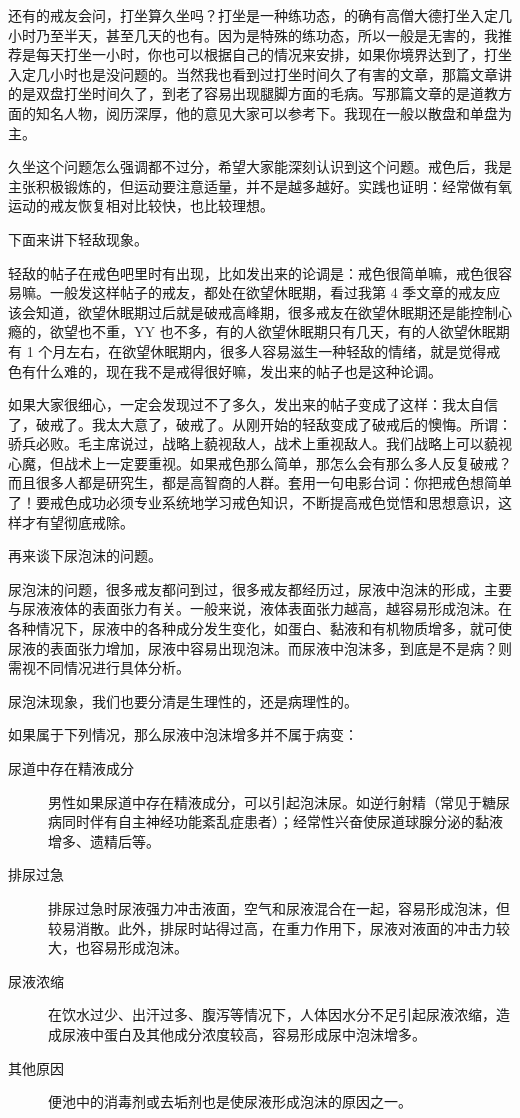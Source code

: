 \documentclass[fontset=founder]{ctexart}
\begin{document}
还有的戒友会问，打坐算久坐吗？打坐是一种练功态，的确有高僧大德打坐入定几小时乃至半天，甚至几天的也有。因为是特殊的练功态，所以一般是无害的，我推荐是每天打坐一小时，你也可以根据自己的情况来安排，如果你境界达到了，打坐入定几小时也是没问题的。当然我也看到过打坐时间久了有害的文章，那篇文章讲的是双盘打坐时间久了，到老了容易出现腿脚方面的毛病。写那篇文章的是道教方面的知名人物，阅历深厚，他的意见大家可以参考下。我现在一般以散盘和单盘为主。

久坐这个问题怎么强调都不过分，希望大家能深刻认识到这个问题。戒色后，我是主张积极锻炼的，但运动要注意适量，并不是越多越好。实践也证明：经常做有氧运动的戒友恢复相对比较快，也比较理想。

下面来讲下轻敌现象。

轻敌的帖子在戒色吧里时有出现，比如发出来的论调是：戒色很简单嘛，戒色很容易嘛。一般发这样帖子的戒友，都处在欲望休眠期，看过我第 4 季文章的戒友应该会知道，欲望休眠期过后就是破戒高峰期，很多戒友在欲望休眠期还是能控制心瘾的，欲望也不重，YY 也不多，有的人欲望休眠期只有几天，有的人欲望休眠期有 1 个月左右，在欲望休眠期内，很多人容易滋生一种轻敌的情绪，就是觉得戒色有什么难的，现在我不是戒得很好嘛，发出来的帖子也是这种论调。

如果大家很细心，一定会发现过不了多久，发出来的帖子变成了这样：我太自信了，破戒了。我太大意了，破戒了。从刚开始的轻敌变成了破戒后的懊悔。所谓：骄兵必败。毛主席说过，战略上藐视敌人，战术上重视敌人。我们战略上可以藐视心魔，但战术上一定要重视。如果戒色那么简单，那怎么会有那么多人反复破戒？而且很多人都是研究生，都是高智商的人群。套用一句电影台词：你把戒色想简单了！要戒色成功必须专业系统地学习戒色知识，不断提高戒色觉悟和思想意识，这样才有望彻底戒除。

再来谈下尿泡沫的问题。

尿泡沫的问题，很多戒友都问到过，很多戒友都经历过，尿液中泡沫的形成，主要与尿液液体的表面张力有关。一般来说，液体表面张力越高，越容易形成泡沫。在各种情况下，尿液中的各种成分发生变化，如蛋白、黏液和有机物质增多，就可使尿液的表面张力增加，尿液中容易出现泡沫。而尿液中泡沫多，到底是不是病？则需视不同情况进行具体分析。

尿泡沫现象，我们也要分清是生理性的，还是病理性的。

如果属于下列情况，那么尿液中泡沫增多并不属于病变：

\begin{description}
    \item [尿道中存在精液成分] 男性如果尿道中存在精液成分，可以引起泡沫尿。如逆行射精（常见于糖尿病同时伴有自主神经功能紊乱症患者）；经常性兴奋使尿道球腺分泌的黏液增多、遗精后等。
    \item [排尿过急] 排尿过急时尿液强力冲击液面，空气和尿液混合在一起，容易形成泡沫，但较易消散。此外，排尿时站得过高，在重力作用下，尿液对液面的冲击力较大，也容易形成泡沫。
    \item [尿液浓缩] 在饮水过少、出汗过多、腹泻等情况下，人体因水分不足引起尿液浓缩，造成尿液中蛋白及其他成分浓度较高，容易形成尿中泡沫增多。
    \item [其他原因] 便池中的消毒剂或去垢剂也是使尿液形成泡沫的原因之一。
\end{description}
\end{document}
